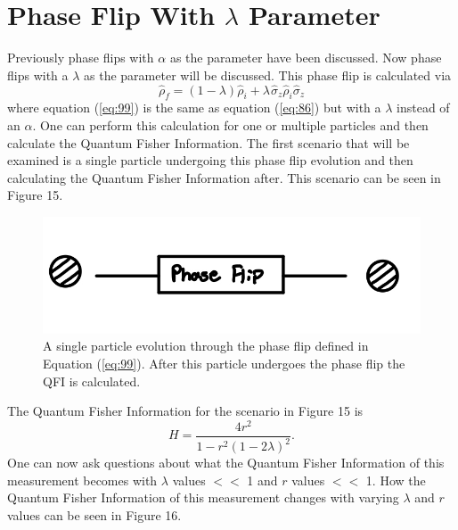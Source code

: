 \documentclass[twocolumn]{article}
\begin{document}
\section*{Phase Flip With $\lambda$ Parameter}
Previously phase flips with $\alpha$ as the parameter have been discussed. Now phase flips with a $\lambda$ as the parameter will be discussed. This phase flip is calculated via
\begin{equation}\label{eq:99}
\hat{\rho}_f=(1-\lambda)\hat{\rho}_i+\lambda\hspace{1pt}\hat{\sigma}_z\hat{\rho}_i\hat{\sigma}_z
\end{equation}
where equation (\ref{eq:99}) is the same as equation (\ref{eq:86}) but with a $\lambda$ instead of an $\alpha$. One can perform this calculation for one or multiple particles and then calculate the Quantum Fisher Information. The first scenario that will be examined is a single particle undergoing this phase flip evolution and then calculating the Quantum Fisher Information after. This scenario can be seen in Figure 15.
\begin{figure}[h]
\begin{center}
\includegraphics[width=0.65\linewidth]{Single-Particle-Phase-Flip-Evolution-Schematic.jpg}
\caption{A single particle evolution through the phase flip defined in Equation (\ref{eq:99}). After this particle undergoes the phase flip the QFI is calculated.}
\end{center}
\end{figure}
\newline
The Quantum Fisher Information for the scenario in Figure 15 is
\begin{equation}\label{eq:100}
H=\frac{4r^2}{1-r^2(1-2\lambda)^2}.
\end{equation}
One can now ask questions about what the Quantum Fisher Information of this measurement becomes with $\lambda$ values $<<$ 1 and $r$ values $<<$ 1. How the Quantum Fisher Information of this measurement changes with varying $\lambda$ and $r$ values can be seen in Figure 16.
\end{document}
